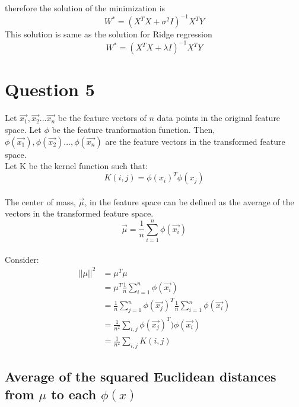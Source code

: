 \documentclass{article}
\begin{document}
therefore the solution of the minimization is 
\begin{equation*}
		W^* = (X^TX + \sigma^2I)^{-1}X^TY
\end{equation*}
This solution is same as the solution for Ridge regression
\begin{equation*}
	W^* = (X^TX  + \lambda I)^{-1}X^TY
\end{equation*}

\section*{Question 5}
 
Let $\vec{x_{1}}, \vec{x_{2}} ... \vec{x_{n}}$ be the feature vectors of $n$ data points in the original feature space. Let $\phi$ be the feature tranformation function. Then, $\phi(\vec{x_{1}}), \phi(\vec{x_{2}}) ..., \phi(\vec{x_{n}})$ are the feature vectors in the transformed feature space.  
\\
Let K be the kernel function such that:
\begin{equation*}
K(i,j) = \phi(x_{i})^T \phi(x_{j})
\end{equation*} 
\\
The center of mass, $\vec{\mu}$, in the feature space can be defined as the average of the vectors in the transformed feature space. 
\begin{equation*}
\vec{\mu} = \frac{1}{n}\sum_{i=1}^{n} \phi(\vec{x_{i}})
\end{equation*}
\\
Consider:
\begin{equation*}
\begin{split}
||{\mu}||^{2} &= \mu^T\mu \\ 
              &= \mu^T \frac{1}{n}\sum_{i=1}^{n} \phi(\vec{x_{i}}) \\
              &= \frac{1}{n}\sum_{j=1}^{n} \phi(\vec{x_{j}})^T \frac{1}{n}\sum_{i=1}^{n} \phi(\vec{x_{i}}) \\
              &= \frac{1}{n^2} \sum_{i,j} \phi(\vec{x_{j}})^{T}) \phi(\vec{x_{i}}) \\
              &= \frac{1}{n^2} \sum_{i,j} K(i,j)
\end{split}
\end{equation*}

\subsection*{Average of the squared Euclidean distances from $\mu$ to each $\phi(x)$} 
\end{document}
